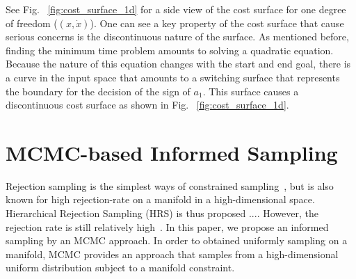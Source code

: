 \documentclass[letterpaper, 10 pt, conference]{ieeeconf}  %
\begin{document}
See Fig. ~\ref{fig:cost_surface_1d} for a side view of the cost surface for one degree of freedom ($\left(x, \dot{x}\right)$). One can see a key property of the cost surface that cause serious concerns is the discontinuous nature of the surface. As mentioned before, finding the minimum time problem amounts to solving a quadratic equation. Because the nature of this equation changes with the start and end goal, there is a curve in the input space that amounts to a switching surface that represents the boundary for the decision of the sign of $a_1$. This surface causes a discontinuous cost surface as shown in Fig. ~\ref{fig:cost_surface_1d}.

\section{MCMC-based Informed Sampling}


Rejection sampling is the simplest ways of constrained sampling~\cite{}, but is also known for high rejection-rate on a manifold in a high-dimensional space.
Hierarchical Rejection Sampling (HRS) is thus proposed .... 
However, the rejection rate is still relatively high~\cite{}.
In this paper, we propose an informed sampling by an MCMC approach.
In order to obtained uniformly sampling on a manifold, MCMC provides an approach that samples from a high-dimensional uniform distribution subject to a manifold constraint.


\end{document}
